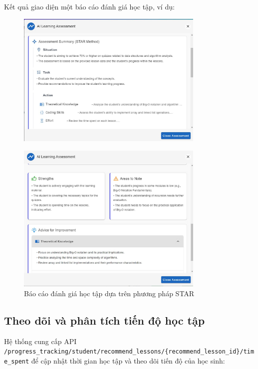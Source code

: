Kết quả giao diện một báo cáo đánh giá học tập, ví dụ:
\begin{figure}[H]
    \centering
    \includegraphics[width=0.8\textwidth]{Images/UI_LLM/Assessment_1.png}
\end{figure}
\begin{figure}[H]
    \centering
    \includegraphics[width=0.8\textwidth]{Images/UI_LLM/Assessment_2.png}
    \caption{Báo cáo đánh giá học tập dựa trên phương pháp STAR}
\end{figure}
\subsection{Theo dõi và phân tích tiến độ học tập}
Hệ thống cung cấp API \texttt{/progress\_tracking/student/recommend\_lessons/\{recommend\_lesson\_id\}/time\_spent} để cập nhật thời gian học tập và theo dõi tiến độ của học sinh:

